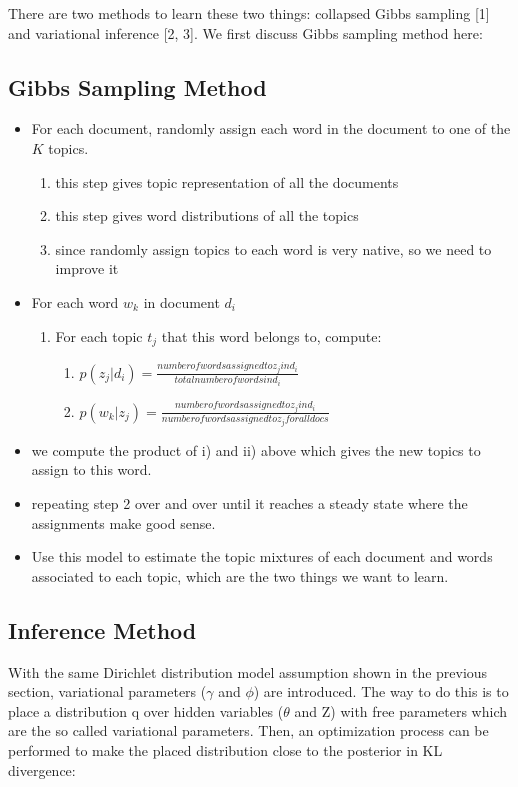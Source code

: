 \documentclass{article} %
\begin{document}
There are two methods to learn these two things: collapsed Gibbs sampling [1] and variational inference [2, 3]. We first discuss Gibbs sampling method here:


\subsection{Gibbs Sampling Method}
\begin{itemize}
\item For each document, randomly assign each word in the document to one of the $K$ topics.
\begin{enumerate}
\item this step gives topic representation of all the documents
\item this step gives word distributions of all the topics
\item since randomly assign topics to each word is very native, so we need to improve it
\end{enumerate}
\item For each word $w_k$ in document $d_i$
\begin{enumerate}
\item For each topic $t_j$ that this word belongs to, compute:
\begin{enumerate}
\item $p(z_j | d_i)  = \frac{number of words assigned to z_j in d_i}{total number of words in d_i}$
\item $p( w_k |  z_j) = \frac{number of words assigned to z_j in d_i}{number of words assigned to z_j for all docs}$
\end{enumerate}
\end{enumerate}
\item we compute the product of i) and ii) above which gives the new topics to assign to this word.
\item repeating step 2 over and over until it reaches a steady state where the assignments make good sense.
\item Use this model to estimate the topic mixtures of each document and words associated to each topic, which are the two things we want to learn.
\end{itemize}



\subsection{Inference Method}
With the same Dirichlet distribution model assumption shown in the previous section, variational parameters ($\gamma$ and $\phi$) are introduced. The way to do this is to place a distribution q over hidden variables ($\theta$ and Z) with free parameters which are the so called variational parameters. Then, an optimization process can be performed to make the placed distribution close to the posterior in KL divergence:\\
\end{document}
